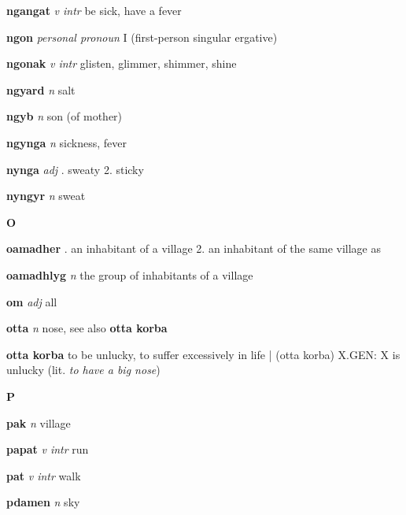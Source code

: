 \textbf{ngangat}   \emph{v intr} \textperiodcentered be sick, have a fever

\textbf{ngon}   \emph{personal pronoun} \textperiodcentered I (first-person singular ergative)

\textbf{ngonak}   \emph{v intr} \textperiodcentered glisten, glimmer, shimmer, shine

\textbf{ngyard}   \emph{n} \textperiodcentered salt

\textbf{ngyb}   \emph{n} \textperiodcentered son (of mother)

\textbf{ngynga}   \emph{n} \textperiodcentered sickness, fever

\textbf{nynga}   \emph{adj} . sweaty 2. sticky 

\textbf{nyngyr}   \emph{n} \textperiodcentered sweat

\begin{center} \Huge \bfseries O \end{center}\textbf{oamadher}    . an inhabitant of a village 2. an inhabitant of the same village as \GEN 

\textbf{oamadhlyg}   \emph{n} \textperiodcentered the group of inhabitants of a village

\textbf{om}   \emph{adj} \textperiodcentered all

\textbf{otta}   \emph{n} \textperiodcentered nose, see also \textbf{otta korba}

\textbf{otta korba}    \textperiodcentered to be unlucky, to suffer excessively in life | (otta korba) X.GEN: X is unlucky (lit. \emph{to have a big nose})

\begin{center} \Huge \bfseries P \end{center}\textbf{pak}   \emph{n} \textperiodcentered village

\textbf{papat}   \emph{v intr} \textperiodcentered run

\textbf{pat}   \emph{v intr} \textperiodcentered walk

\textbf{pdamen}   \emph{n} \textperiodcentered sky


